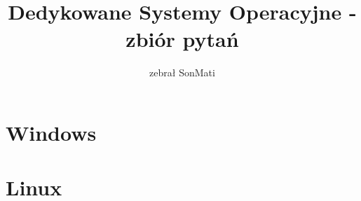 \documentclass[a4paper,twoside]{article}
\newcommand{\Tak}[1] {
	\color{Gurin}{#1}
}
\newcommand{\Nie}[1] {
	\color{Red}{#1}
}
\newcommand{\question}[9] {
	\textbf{#1}
	\begin{enumerate}[a.]
		\ifnum\pdfstrcmp{#2}{Tak}=0
			\Tak{\item #3}
		\else
			\Nie{\item #3}
		\fi
		\color{black}
		\ifnum\pdfstrcmp{#4}{Tak}=0
			\Tak{\item #5}
		\else
			\Nie{\item #5}
		\fi
		\color{black}
		\ifnum\pdfstrcmp{#6}{Tak}=0
			\Tak{\item #7}
		\else
			\Nie{\item #7}
		\fi
		\color{black}
		\ifnum\pdfstrcmp{#8}{Tak}=0
			\Tak{\item #9}
		\else
			\Nie{\item #9}
		\fi
	\end{enumerate}
}
\begin{document}





\begin{titlepage}
\title{\huge Dedykowane Systemy Operacyjne - zbiór pytań}
\author{\large zebrał SonMati}
\maketitle
\end{titlepage}

\part{Windows}
	
	
	
	
		
	
	
	
	
	
	
	
	
\part{Linux}
	
	
	
	
	
	
	
	
	
	
	
\end{document}
